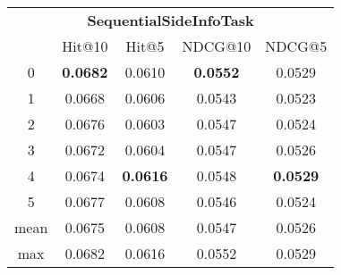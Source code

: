 \documentclass{article}
\begin{document}
 

\begin{tabular}{c|cccc}

\multicolumn{5}{c}{\textbf{SequentialSideInfoTask}} \\
\noalign{\smallskip}
\noalign{\smallskip}
\toprule
\multicolumn{1}{c}{Template ID} & \multicolumn{1}{|c}{Hit@10} & \multicolumn{1}{c}{Hit@5} & \multicolumn{1}{c}{NDCG@10} & \multicolumn{1}{c}{NDCG@5} \\
\midrule
0 & \textbf{0.0682} & 0.0610 & \textbf{0.0552} & 0.0529 \\
1 & 0.0668 & 0.0606 & 0.0543 & 0.0523 \\
2 & 0.0676 & 0.0603 & 0.0547 & 0.0524 \\
3 & 0.0672 & 0.0604 & 0.0547 & 0.0526 \\
4 & 0.0674 & \textbf{0.0616} & 0.0548 & \textbf{0.0529} \\
5 & 0.0677 & 0.0608 & 0.0546 & 0.0524 \\
\midrule
mean & 0.0675 & 0.0608 & 0.0547 & 0.0526 \\
max & 0.0682 & 0.0616 & 0.0552 & 0.0529 \\
\bottomrule

\end{tabular}
\end{document}
